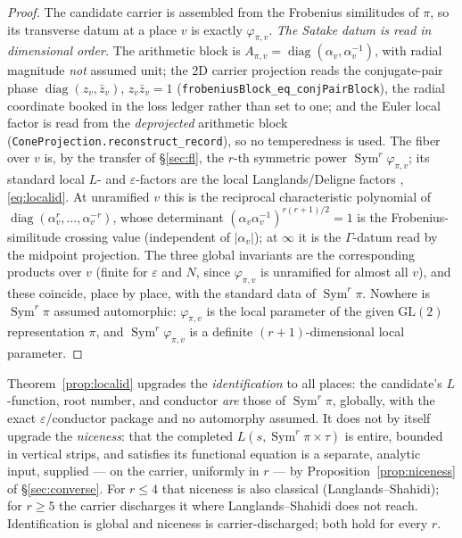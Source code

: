 \documentclass[11pt]{article}
\theoremstyle{definition}
\newcommand{\Sym}{\operatorname{Sym}}
\begin{document}
\begin{proof}
The candidate carrier is assembled from the Frobenius similitudes of $\pi$, so its transverse datum at a
place $v$ is exactly $\varphi_{\pi,v}$. \emph{The Satake datum is read in dimensional order.} The arithmetic
block is $A_{\pi,v}=\operatorname{diag}(\alpha_v,\alpha_v^{-1})$, with radial magnitude \emph{not} assumed
unit; the 2D carrier projection reads the conjugate-pair phase $\operatorname{diag}(z_v,\bar z_v)$, $z_v\bar
z_v=1$ (\texttt{frobeniusBlock\_eq\_conjPairBlock}), the radial coordinate booked in the loss ledger rather
than set to one; and the Euler local factor is read from the \emph{deprojected} arithmetic block
(\texttt{ConeProjection.reconstruct\_record}), so no temperedness is used. The fiber over $v$ is, by the transfer
of \S\ref{sec:fl}, the $r$-th symmetric power $\Sym^r\varphi_{\pi,v}$; its standard local $L$- and
$\varepsilon$-factors are the local Langlands/Deligne factors \cite{Tate}, \eqref{eq:localid}. At unramified
$v$ this is the reciprocal characteristic polynomial of
$\operatorname{diag}(\alpha_v^{r},\dots,\alpha_v^{-r})$, whose determinant
$(\alpha_v\alpha_v^{-1})^{r(r+1)/2}=1$ is the Frobenius-similitude crossing value (independent of
$|\alpha_v|$); at $\infty$ it is the $\Gamma$-datum read by the midpoint projection. The three
global invariants are the corresponding products over
$v$ (finite for $\varepsilon$ and $N$, since $\varphi_{\pi,v}$ is unramified for almost all $v$), and
these coincide, place by place, with the standard data of $\Sym^r\pi$. Nowhere is $\Sym^r\pi$ assumed
automorphic: $\varphi_{\pi,v}$ is the local parameter of the given $\mathrm{GL}(2)$ representation $\pi$,
and $\Sym^r\varphi_{\pi,v}$ is a definite $(r{+}1)$-dimensional local parameter.
\end{proof}

Theorem~\ref{prop:localid} upgrades the \emph{identification} to all places: the candidate's
$L$-function, root number, and conductor \emph{are} those of $\Sym^r\pi$, globally, with the exact
$\varepsilon$/conductor package and no automorphy assumed. It does not by itself upgrade the \emph{niceness}: that
the completed $L(s,\Sym^r\pi\times\tau)$ is entire, bounded in vertical strips, and satisfies its
functional equation is a separate, analytic input, supplied --- on the carrier, uniformly in $r$ --- by
Proposition~\ref{prop:niceness} of \S\ref{sec:converse}. For $r\le4$ that niceness is also classical
(Langlands--Shahidi); for $r\ge5$ the carrier discharges it where Langlands--Shahidi does not reach.
Identification is global and niceness is carrier-discharged; both hold for every $r$.
\end{document}
